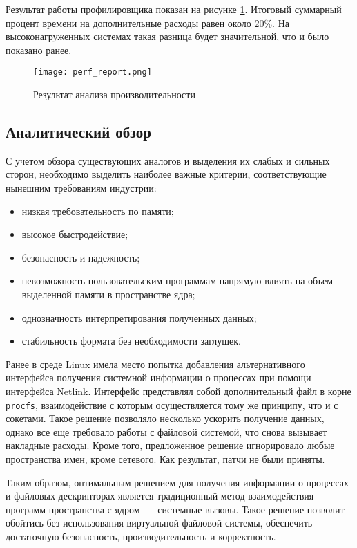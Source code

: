 Результат работы профилировщика показан на рисунке \ref{fig:perf_report}.
Итоговый суммарный процент времени на дополнительные расходы равен около 20\%.
На высоконагруженных системах такая разница будет значительной, что и было
показано ранее.

\begin{figure}
  \centering
  \texttt{[image: perf\_report.png]}
  \caption{Результат анализа производительности}
  \label{fig:perf_report}
\end{figure}

\subsection{Аналитический обзор}
\label{sub:domain:analitic_overview}

С учетом обзора существующих аналогов и выделения их слабых и сильных сторон,
необходимо выделить наиболее важные критерии, соответствующие нынешним
требованиям индустрии:

\begin{itemize}
\item низкая требовательность по памяти;
\item высокое быстродействие;
\item безопасность и надежность;
\item невозможность пользовательским программам напрямую влиять на объем
  выделенной памяти в пространстве ядра;
\item однозначность интерпретирования полученных данных;
\item стабильность формата без необходимости заглушек.
\end{itemize}

Ранее в среде Linux имела место попытка добавления альтернативного интерфейса
получения системной информации о процессах при помощи интерфейса
Netlink\cite{vagin}. Интерфейс представлял собой дополнительный файл в корне
\texttt{procfs}, взаимодействие с которым осуществляется тому же принципу, что и
с сокетами. Такое решение позволяло несколько ускорить получение данных, однако
все еще требовало работы с файловой системой, что снова вызывает накладные
расходы. Кроме того, предложенное решение игнорировало любые пространства имен,
кроме сетевого. Как результат, патчи не были приняты.

Таким образом, оптимальным решением для получения информации о процессах и
файловых дескрипторах является традиционный метод взаимодействия программ
пространства с ядром~--- системные вызовы\cite{man_syscall}. Такое решение
позволит обойтись без использования виртуальной файловой системы, обеспечить
достаточную безопасность, производительность и корректность.

\nocite{tanenbaum, lkml}
